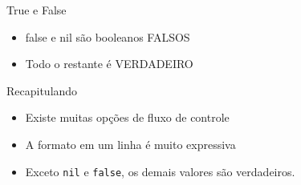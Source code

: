\begin{frame}[fragile,t]{True e False}
  \begin{itemize}
    \item \alert{false} e \alert{nil} são booleanos \alert{FALSOS}
    \item Todo o restante é \alert{VERDADEIRO}
	
  \end{itemize}   
\end{frame}
\begin{frame}[fragile,t]{Recapitulando}
  \begin{itemize}
    \item Existe muitas opções de fluxo de controle
    \item A formato em um linha é muito expressiva
    \item Exceto \verb!nil! e \verb!false!, os demais valores são verdadeiros.
  \end{itemize}
\end{frame}



